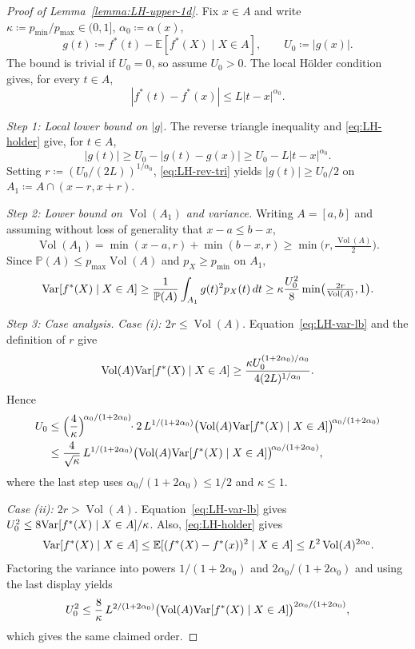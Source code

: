 \documentclass[11pt]{article}
\theoremstyle{plain}
\theoremstyle{definition}
\theoremstyle{remark}
\theoremstyle{plain}
\renewcommand{\P}{\mathbb{P}}
\newcommand{\E}{\mathbb{E}}
\newcommand{\Var}{\textnormal{Var}}
\DeclareMathOperator{\Vol}{Vol}
\newcommand{\1}{\mathbbm{1}}
\begin{document}
\begin{proof}[Proof of Lemma~\ref{lemma:LH-upper-1d}]
Fix $x\in A$ and write
$\kappa\coloneqq p_{\min}/p_{\max}\in(0,1]$,
$\alpha_0\coloneqq\alpha(x)$,
\[
g(t)\coloneqq f^*(t)-\E[f^*(X)\mid X\in A],
\qquad U_0\coloneqq|g(x)|.
\]
The bound is trivial if $U_0=0$, so assume $U_0>0$. The local
H\"older condition gives, for every $t\in A$,
\begin{equation}
\label{eq:LH-holder}
|f^*(t)-f^*(x)|\le L|t-x|^{\alpha_0}.
\end{equation}

\emph{Step 1: Local lower bound on $|g|$.}
The reverse triangle inequality and \eqref{eq:LH-holder} give, for $t\in A$,
\begin{equation}
\label{eq:LH-rev-tri}
|g(t)|\ge U_0-|g(t)-g(x)|
\ge U_0-L|t-x|^{\alpha_0}.
\end{equation}
Setting $r\coloneqq(U_0/(2L))^{1/\alpha_0}$,
\eqref{eq:LH-rev-tri} yields $|g(t)|\ge U_0/2$ on
$A_1\coloneqq A\cap(x-r,x+r)$.

\emph{Step 2: Lower bound on $\Vol(A_1)$ and variance.}
Writing $A=[a,b]$ and assuming without loss of generality that
$x-a\le b-x$,
\begin{equation*}
\Vol(A_1)
=\min(x-a,r)+\min(b-x,r)
\ge\min\bigl(r,\tfrac{\Vol(A)}2\bigr).
\end{equation*}
Since $\P(A)\le p_{\max}\Vol(A)$ and $p_X\ge p_{\min}$ on $A_1$,
\begin{equation}
\label{eq:LH-var-lb}
\Var[f^*(X)\mid X\in A]
\ge\frac{1}{\P(A)}\int_{A_1}g(t)^2p_X(t)\,dt
\ge\kappa\frac{U_0^2}{8}
\min\bigl(\tfrac{2r}{\Vol(A)},1\bigr).
\end{equation}

\emph{Step 3: Case analysis.}
\emph{Case (i): $2r\le\Vol(A)$.} Equation~\eqref{eq:LH-var-lb}
and the definition of $r$ give
\[
\Vol(A)\Var[f^*(X)\mid X\in A]
\ge
\frac{\kappa U_0^{(1+2\alpha_0)/\alpha_0}}
{4(2L)^{1/\alpha_0}}.
\]
Hence
\begin{align*}
U_0
&\leq
\Bigl(\frac{4}{\kappa}\Bigr)^{\!\alpha_0/(1+2\alpha_0)}\!\!
\cdot 2\,L^{1/(1+2\alpha_0)}
\bigl(\Vol(A)\Var[f^*(X)\mid X\in A]\bigr)^{\!\alpha_0/(1+2\alpha_0)} \\
&\leq
\frac{4}{\sqrt\kappa}\,L^{1/(1+2\alpha_0)}
\bigl(\Vol(A)\Var[f^*(X)\mid X\in A]\bigr)^{\!\alpha_0/(1+2\alpha_0)},
\end{align*}
where the last step uses $\alpha_0/(1+2\alpha_0)\leq 1/2$ and $\kappa\leq 1$.

\emph{Case (ii): $2r>\Vol(A)$.} Equation~\eqref{eq:LH-var-lb} gives
$U_0^2\le 8\Var[f^*(X)\mid X\in A]/\kappa$. Also,
\eqref{eq:LH-holder} gives
\begin{equation*}
\Var[f^*(X)\mid X\in A]
\le\E[(f^*(X)-f^*(x))^2\mid X\in A]
\le L^2\Vol(A)^{2\alpha_0}.
\end{equation*}
Factoring the variance into powers $1/(1+2\alpha_0)$ and
$2\alpha_0/(1+2\alpha_0)$ and using the last display yields
\begin{equation*}
U_0^2
\le\frac{8}{\kappa}\,L^{2/(1+2\alpha_0)}
\bigl(\Vol(A)\Var[f^*(X)\mid X\in A]\bigr)^{2\alpha_0/(1+2\alpha_0)},
\end{equation*}
which gives the same claimed order.


\end{proof}
\end{document}
